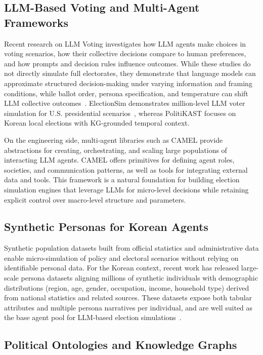\documentclass[11pt]{article}
\begin{document}
\subsection{LLM-Based Voting and Multi-Agent Frameworks}

Recent research on LLM Voting investigates how LLM agents make choices in voting scenarios, how their collective decisions compare to human preferences, and how prompts and decision rules influence outcomes. While these studies do not directly simulate full electorates, they demonstrate that language models can approximate structured decision-making under varying information and framing conditions, while ballot order, persona specification, and temperature can shift LLM collective outcomes~\cite{yang2024llmvoting}. ElectionSim demonstrates million-level LLM voter simulation for U.S. presidential scenarios~\cite{liu2024electionsim}, whereas PolitiKAST focuses on Korean local elections with KG-grounded temporal context.

On the engineering side, multi-agent libraries such as CAMEL provide abstractions for creating, orchestrating, and scaling large populations of interacting LLM agents. CAMEL offers primitives for defining agent roles, societies, and communication patterns, as well as tools for integrating external data and tools. This framework is a natural foundation for building election simulation engines that leverage LLMs for micro-level decisions while retaining explicit control over macro-level structure and parameters.

\subsection{Synthetic Personas for Korean Agents}

Synthetic population datasets built from official statistics and administrative data enable micro-simulation of policy and electoral scenarios without relying on identifiable personal data. For the Korean context, recent work has released large-scale persona datasets aligning millions of synthetic individuals with demographic distributions (region, age, gender, occupation, income, household type) derived from national statistics and related sources. These datasets expose both tabular attributes and multiple persona narratives per individual, and are well suited as the base agent pool for LLM-based election simulations~\cite{bhattacharjee2024nemotron}.

\subsection{Political Ontologies and Knowledge Graphs}
\end{document}
